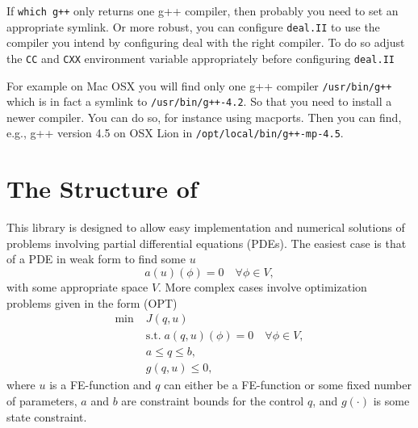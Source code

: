   If \texttt{which g++} only returns one g++ compiler, then probably you need to
  set an appropriate symlink. Or more robust, you can configure \texttt{deal.II}
  to use the compiler you intend by configuring deal with the right compiler. To
  do so adjust  the \texttt{CC} and \texttt{CXX} environment variable appropriately
  before configuring \texttt{deal.II}
  
  For example on Mac OSX you will find only one g++ compiler \texttt{/usr/bin/g++}
  which is in fact a symlink to \texttt{/usr/bin/g++-4.2}. 
  So that you need to install a newer compiler. You can do so, for instance
  using macports. Then you can find, e.g., g++ version 4.5 on OSX Lion 
  in \texttt{/opt/local/bin/g++-mp-4.5}. 


\chapter{The Structure of \dope{}}
This library is designed to allow easy implementation and numerical solutions 
of problems involving partial differential equations (PDEs). The easiest case 
is that of a PDE in weak form to find some $u$
\[
a(u)(\phi) = 0 \quad \forall \phi \in V,
\]
with some appropriate space $V$.
More complex cases involve optimization problems given in the form (OPT)
\begin{align*}
\min\;&J(q,u) \\
  &\text{s.t.}\; a(q,u)(\phi) = 0 \quad \forall \phi\in V,\\
  &a \le q \le b,\\
  &g(q,u) \le 0,  
\end{align*}
where $u$ is a FE-function and $q$ can either be a FE-function or some 
fixed number of parameters, $a$ and $b$ are constraint bounds for the control $q$,
and $g(\cdot)$ is some state constraint.


